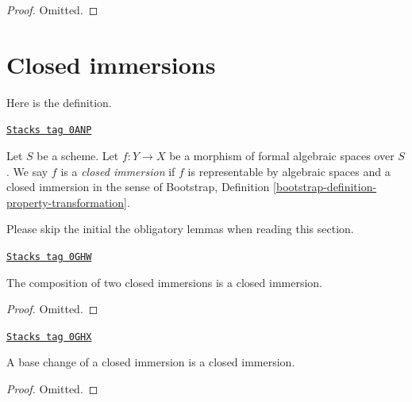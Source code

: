 \begin{proof}
Omitted.
\end{proof}

\section{Closed immersions}
\label{formal-spaces-section-closed-immersions}
Here is the definition.

\begin{definition}
\label{formal-spaces-definition-closed-immersion}
\href{https://stacks.math.columbia.edu/tag/0ANP}{\texttt{Stacks tag 0ANP}}

Let $S$ be a scheme. Let $f : Y \to X$ be a morphism of formal algebraic
spaces over $S$. We say $f$ is a {\it closed immersion}
if $f$ is representable by algebraic spaces and a closed immersion
in the sense of
Bootstrap, Definition \ref{bootstrap-definition-property-transformation}.
\end{definition}

Please skip the initial the obligatory lemmas when reading this section.

\begin{lemma}
\label{formal-spaces-lemma-composition-closed-immersion}
\href{https://stacks.math.columbia.edu/tag/0GHW}{\texttt{Stacks tag 0GHW}}

The composition of two closed immersions is a closed immersion.
\end{lemma}

\begin{proof}
Omitted.
\end{proof}

\begin{lemma}
\label{formal-spaces-lemma-base-change-closed-immersion}
\href{https://stacks.math.columbia.edu/tag/0GHX}{\texttt{Stacks tag 0GHX}}

A base change of a closed immersion is a closed immersion.
\end{lemma}

\begin{proof}
Omitted.
\end{proof}

